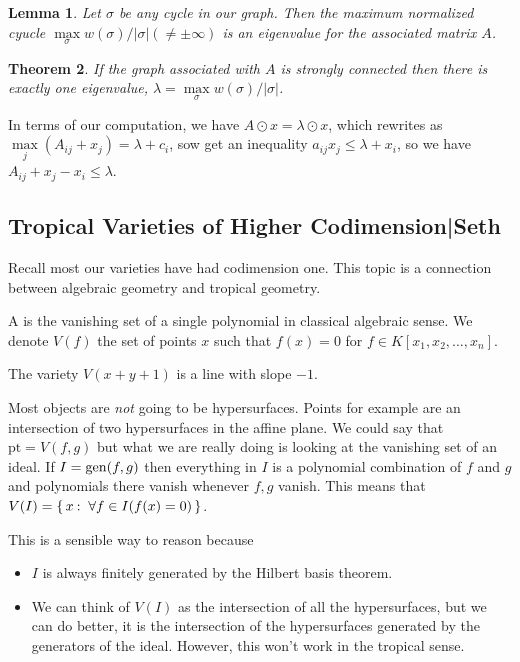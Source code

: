 \documentclass[12pt]{memoir}
\newtheorem{prototheorem}{Theorem}[section]
\newenvironment{theorem}
   {\begin{prototheorem}}
   {\end{prototheorem}}
\newtheorem{protolemma}[prototheorem]{Lemma}
\newenvironment{lemma}
   {\begin{protolemma}}
   {\end{protolemma}}
\theoremstyle{definition}
\begin{document}
\begin{lemma}
    Let $\sigma$ be any cycle in our graph. Then the maximum normalized cyucle $\max\limits_{\sigma} w(\sigma)/|\sigma| (\neq \pm \infty)$ is an eigenvalue for the associated matrix $A$.
\end{lemma}


\begin{theorem}
    If the graph  associated with $A$ is strongly connected then there is exactly one eigenvalue, $\lambda=\max\limits_{\sigma} w(\sigma)/|\sigma|$.
\end{theorem}


In terms of our computation, we have $A \odot x = \lambda \odot x$, which rewrites as $\max\limits_{j} (A_{ij} + x_j) = \lambda + c_i$, sow  get an inequality $a_{ij} x_j \leq \lambda + x_i$, so we have $A_{ij}+x_j-x_i\leq\lambda$.





\subsection{Tropical Varieties of Higher Codimension|Seth}

Recall most our varieties have had codimension one. This topic is a connection between algebraic geometry and tropical geometry.

\begin{Def}
    A  is the vanishing set of a single polynomial in classical algebraic sense. We denote $V(f)$ the set of points $x$ such that $f(x)=0$ for $f\in K[x_1,x_2,\dots,x_n]$.
\end{Def}

\begin{Ex}
    The variety $V(x+y+1)$ is a line with slope $-1$. 
\end{Ex}

Most objects are \emph{not} going to be hypersurfaces. Points for example are an intersection of two hypersurfaces in the affine plane. We could say that $\text{pt}=V(f,g)$ but what we are really doing is looking at the vanishing set of an ideal. If $I=\operatorname{gen}(f,g)$ then everything in $I$ is a polynomial combination of $f$ and $g$ and polynomials there vanish whenever $f,g$ vanish.  This means that $V(I)=\set{x\:\ \forall f\in I(f(x)=0)}$.\par 
This is a sensible way to reason because 

\begin{itemize}
    \item $I$ is always finitely generated by the Hilbert basis theorem.
    \item We can think of $V(I)$ as the intersection of all the hypersurfaces, but we can do better, it is the intersection of the hypersurfaces generated by the generators of the ideal. However, this won't work in the tropical sense. 
\end{itemize}
\end{document}
